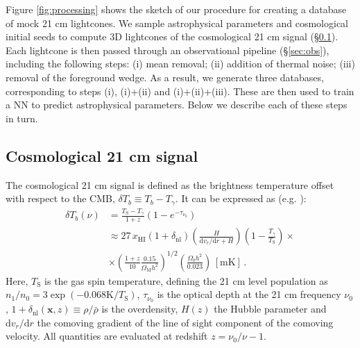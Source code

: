 \documentclass[fleqn,usenatbib]{mnras}
\begin{document}
Figure \ref{fig:processing} shows the sketch of our procedure for creating a database of mock 21 cm lightcones.  We sample astrophysical parameters and cosmological initial seeds to compute $3\mathrm{D}$ lightcones of the cosmological 21 cm signal (\S\ref{sec:cosmo}).  Each lightcone is then passed through an observational pipeline (\S\ref{sec:obs}), including the following steps: (i) mean removal; (ii) addition of thermal noise; (iii) removal of the foreground wedge.  As a result, we generate three databases, corresponding to steps (i), (i)+(ii) and (i)+(ii)+(iii).  These are then used to train a NN to predict astrophysical parameters.  Below we describe each of these steps in turn.  

\subsection{Cosmological 21 cm signal} \label{sec:cosmo}

The cosmological 21 cm signal is defined as the brightness temperature offset with respect to the CMB, $\delta T_b \equiv T_b - T_\gamma$. It can be expressed as (e.g. \citealt{Furlanetto06}):
\begin{equation}
    \begin{aligned}
        \delta T_{b}(\nu) &= \frac{T_{\mathrm{S}}-T_{\gamma}}{1+z}\left(1-e^{-\tau_{\nu_{0}}}\right) \\
        &\approx 27 \, x_{\mathrm{HI}}\left(1+\delta_{\mathrm{nl}}\right)\left(\frac{H}{\mathrm{d} v_{r} / \mathrm{d} r+H}\right)\left(1-\frac{T_{\gamma}}{T_{\mathrm{S}}}\right) \times \\
        & \times\left(\frac{1+z}{10} \frac{0.15}{\Omega_{\mathrm{M}} h^{2}}\right)^{1 / 2}\left(\frac{\Omega_{b} h^{2}}{0.023}\right)\, \mathrm{[mK]} \, .
    \end{aligned}
    \label{eq:21 cm_signal}
\end{equation}
Here, $T_{\mathrm{S}}$ is the gas spin temperature, defining the 21 cm level population as $n_1 / n_0 = 3 \exp(-0.068\mathrm{K} / T_{\mathrm{S}})$, $\tau_{\nu_{0}}$ is the optical depth at the 21 cm frequency $\nu_{0}$, $1 + \delta_{\mathrm{nl}}(\mathbf{x}, z) \equiv \rho / \bar{\rho}$ is the overdensity, $H(z)$ the Hubble parameter and $\mathrm{d} v_{r} / \mathrm{d} r$ the comoving gradient of the line of sight component of the comoving velocity. All quantities are evaluated at redshift $z=\nu_{0} / \nu-1$.
\end{document}
